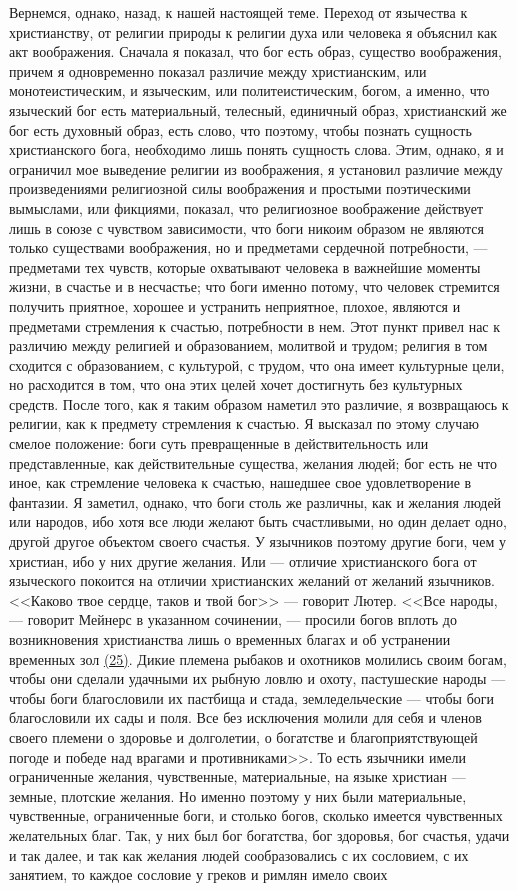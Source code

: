 \documentclass[12pt]{article}
\begin{document}
Вернемся, однако, назад, к нашей настоящей теме. Переход от язычества к христианству, от религии природы к религии духа или человека я объяснил как акт воображения. Сначала я показал, что бог есть образ, существо воображения, причем я одновременно показал различие между христианским, или монотеистическим, и языческим, или политеистическим, богом, а именно, что языческий бог есть материальный, телесный, единичный образ, христианский же бог есть духовный образ, есть слово, что поэтому, чтобы познать сущность христианского бога, необходимо лишь понять сущность слова. Этим, однако, я и ограничил мое выведение религии из воображения, я установил различие между произведениями религиозной силы воображения и простыми поэтическими вымыслами, или фикциями, показал, что религиозное воображение действует лишь в союзе с чувством зависимости, что боги никоим образом не являются только существами воображения, но и предметами сердечной потребности, --- предметами тех чувств, которые охватывают человека в важнейшие моменты жизни, в счастье и в несчастье; что боги именно потому, что человек стремится получить приятное, хорошее и устранить неприятное, плохое, являются и предметами стремления к счастью, потребности в нем. Этот пункт привел нас к различию между религией и образованием, молитвой и трудом; религия в том сходится с образованием, с культурой, с трудом, что она имеет культурные цели, но расходится в том, что она этих целей хочет достигнуть без культурных средств. После того, как я таким образом наметил это различие, я возвращаюсь к религии, как к предмету стремления к счастью. Я высказал по этому случаю смелое положение: боги суть превращенные в действительность или представленные, как действительные существа, желания людей; бог есть не что иное, как стремление человека к счастью, нашедшее свое удовлетворение в фантазии. Я заметил, однако, что боги столь же различны, как и желания людей или народов, ибо хотя все люди желают быть счастливыми, но один делает одно, другой другое объектом своего счастья. У язычников поэтому другие боги, чем у христиан, ибо у них другие желания. Или --- отличие христианского бога от языческого покоится на отличии христианских желаний от желаний язычников. <<Каково твое сердце, таков и твой бог>>  --- говорит Лютер. <<Все народы, --- говорит Мейнерс в указанном сочинении, --- просили богов вплоть до возникновения христианства лишь о временных благах и об устранении временных зол \hyperlink{25}{(25)}\hypertarget{b25}{}. Дикие племена рыбаков и охотников молились своим богам, чтобы они сделали удачными их рыбную ловлю и охоту, пастушеские народы --- чтобы боги благословили их пастбища и стада, земледельческие --- чтобы боги благословили их сады и поля. Все без исключения молили для себя и членов своего племени о здоровье и долголетии, о богатстве и благоприятствующей погоде и победе над врагами и противниками>>. То есть язычники имели ограниченные желания, чувственные, материальные, на языке христиан --- земные, плотские желания. Но именно поэтому у них были материальные, чувственные, ограниченные боги, и столько богов, сколько имеется чувственных желательных благ. Так, у них был бог богатства, бог здоровья, бог счастья, удачи и так далее, и так как желания людей сообразовались с их сословием, с их занятием, то каждое сословие у греков и римлян имело своих 
\end{document}
